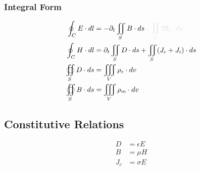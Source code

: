 \documentclass{article}
\begin{document}
\subsubsection*{Integral Form}
    \begin{subequations}\label{eq:MaxwellIntegral}
        \begin{align}
            \oint_C E \cdot dl &=  - \partial_t \iint_S B \cdot ds \begingroup \textcolor{vanish}{- \iint_S \mathfrak{M_i} \cdot ds} \endgroup \label{eq:MaxwellFaradayIntegral} \\
            \oint_C H \cdot dl &=  \partial_t \iint_S D \cdot ds + \iint_S ( J_c + J_i ) \cdot ds \label{eq:AmpereMaxwellIntegral} \\
            \oiint_S D \cdot ds &= \iiint_V \rho_e \cdot dv \label{eq:GaussElectricIntegral} \\
            \oiint_S B \cdot ds &= \iiint_V \rho_m \cdot dv \label{eq:GaussMagneticIntegral}
        \end{align}
    \end{subequations}
\subsection{Constitutive Relations} 
    \begin{subequations}\label{eq:Constitutive}
        \begin{align}
            D &= \epsilon E \label{eq:ConstitutiveElectric} \\ 
            B &= \mu H \label{eq:ConstitutiveMagnetic} \\
            J_c &= \sigma E \label{eq:ConstitutiveCurrentDensity}
        \end{align}
    \end{subequations}
\newpage
\end{document}
